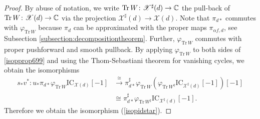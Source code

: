 \documentclass [11pt,oneside,a4paper,mathscr]{amsart}
\theoremstyle{definition}
\newcommand{\X}{\mathscr{X}}
\newcommand{\Tr}{\mathop{\rm Tr}}
\begin{document}
\begin{proof}
By abuse of notation, we write 
$\Tr W \colon \X^{\sharp}(d) \to \mathbb{C}$ the 
pull-back of $\Tr W \colon \X(d) \to \mathbb{C}$
via the projection $\X^{\sharp}(d) \to \X(d)$. 
Note that $\pi_{d*}$ commutes with $\varphi_{\mathrm{Tr}\,W}$ because $\pi_d$ can be approximated with the proper maps $\pi_{\alpha f,d}$, see Subsection \ref{subsection:decompositiontheorem}. Further, $\varphi_{\mathrm{Tr}\,W}$ commutes with proper pushforward and smooth pullback. 
By applying $\varphi_{\mathrm{Tr}\,W}$ to both sides of \eqref{isopprop699} and using the Thom-Sebastiani theorem for vanishing cycles, we obtain the isomorphisms
\begin{align*}
    s_*v^*\colon u_*\pi_{d*}\varphi_{\mathrm{Tr}\,W}\mathrm{IC}_{\X(d)}[-1]&\xrightarrow{\cong} \pi^\sharp_{d*}\varphi_{\mathrm{Tr}\,W}\left(\varphi_{\mathrm{Tr}\,W^q}\mathrm{IC}_{\X^\sharp(d)}[-1]\right)[-1]\\
    &\cong \pi^\sharp_{d*}\varphi_{\mathrm{Tr}\,W^\sharp}\mathrm{IC}_{\X^\sharp(d)}[-1].
\end{align*} 
Therefore we obtain the isomorphism (\ref{isopidstar}). 
  \end{proof}
\end{document}
